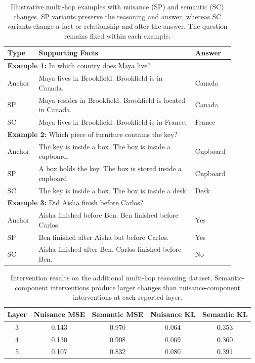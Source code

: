 \begin{table}[t]
\centering
\small
\caption{Illustrative multi-hop examples with nuisance (SP) and
semantic (SC) changes. SP variants preserve the reasoning and answer,
whereas SC variants change a fact or relationship and alter the answer.
The question remains fixed within each example.}
\label{tab:multihop_perturbation_examples}
\begin{tabular}{p{0.13\linewidth} p{0.65\linewidth} p{0.13\linewidth}}
\toprule
Type & Supporting Facts & Answer \\
\midrule
\multicolumn{3}{p{0.95\linewidth}}{
\textbf{Example 1:} In which country does Maya live?} \\
Anchor &
Maya lives in Brookfield. Brookfield is in Canada. &
Canada \\
SP &
Maya resides in Brookfield. Brookfield is located in Canada. &
Canada \\
SC &
Maya lives in Brookfield. Brookfield is in France. &
France \\
\midrule
\multicolumn{3}{p{0.95\linewidth}}{
\textbf{Example 2:} Which piece of furniture contains the key?} \\
Anchor &
The key is inside a box. The box is inside a cupboard. &
Cupboard \\
SP &
A box holds the key. The box is stored inside a cupboard. &
Cupboard \\
SC &
The key is inside a box. The box is inside a desk. &
Desk \\
\midrule
\multicolumn{3}{p{0.95\linewidth}}{
\textbf{Example 3:} Did Aisha finish before Carlos?} \\
Anchor &
Aisha finished before Ben. Ben finished before Carlos. &
Yes \\
SP &
Ben finished after Aisha but before Carlos. &
Yes \\
SC &
Aisha finished after Ben. Carlos finished before Ben. &
No \\
\bottomrule
\end{tabular}
\end{table}

\begin{table}[t]
    \centering
    \small
    \caption{Intervention results on the additional multi-hop
    reasoning dataset. Semantic-component interventions produce
    larger changes than nuisance-component interventions at
    each reported layer.}
    \label{tab:multihop_validation}
    \begin{tabular}{ccccc}
        \toprule
        Layer
        & Nuisance MSE
        & Semantic MSE
        & Nuisance KL
        & Semantic KL \\
        \midrule
        3 & 0.143 & 0.970 & 0.064 & 0.353 \\
        4 & 0.130 & 0.908 & 0.069 & 0.360 \\
        5 & 0.107 & 0.832 & 0.080 & 0.391 \\
        \bottomrule
    \end{tabular}
\end{table}

